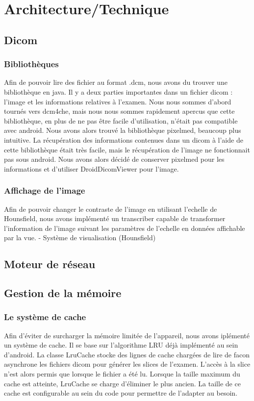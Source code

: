 \chapter{Architecture/Technique}


\section{Dicom}
\subsection{Bibliothèques}
Afin de pouvoir lire des fichier au format .dcm, nous avons du trouver une bibliothèque en java.
Il y a deux parties importantes dans un fichier dicom : l'image et les informations relatives à l'examen.
Nous nous sommes d'abord tournés vers dcm4che, mais nous nous sommes rapidement apercus que cette bibliothèque, en plus de ne pas être facile d'utilisation, n'était pas compatible avec android. Nous avons alors trouvé la bibliothèque pixelmed, beaucoup plus intuitive. La récupération des informations contenues dans un dicom à l'aide de cette bibliothèque était très facile, mais le récupération de l'image ne fonctionnait pas sous android. Nous avons alors décidé de conserver pixelmed pour les informations et d'utiliser DroidDicomViewer pour l'image.

\subsection{Affichage de l'image}
Afin de pouvoir changer le contraste de l'image en utilisant l'echelle de Hounsfield, nous avons implémenté un transcriber capable de transformer l'information de l'image suivant les paramètres de l'echelle en données affichable par la vue.
- Système de visualisation (Hounsfield)

\section{Moteur de réseau}

\section{Gestion de la mémoire}
\subsection{Le système de cache}
Afin d'éviter de surcharger la mémoire limitée de l'appareil, nous avons iplémenté un système de cache.
Il se base sur l'algorithme LRU déjà implémenté au sein d'android. La classe LruCache stocke des lignes de cache chargées de lire de facon asynchrone les fichiers dicom pour générer les slices de l'examen. L'accès à la slice n'est alors permis que lorsque le fichier a été lu.
Lorsque la taille maximum du cache est atteinte, LruCache se charge d'éliminer le plus ancien.
La taille de ce cache est configurable au sein du code pour permettre de l'adapter au besoin.


